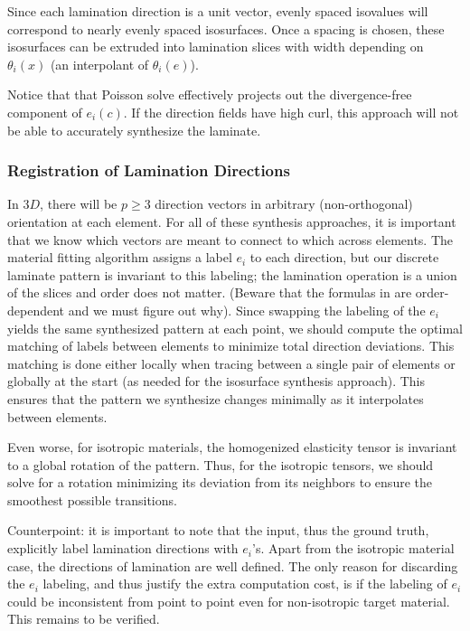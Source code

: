 \documentclass[10pt]{article}
\begin{document}
Since each lamination direction is a unit vector, evenly
spaced isovalues will correspond to nearly evenly spaced isosurfaces.
Once a spacing is chosen, these isosurfaces can be extruded into lamination
slices with width depending on $\theta_i(x)$ (an interpolant of $\theta_i(e)$).

Notice that that Poisson solve effectively projects out the divergence-free
component of $e_i(c)$. If the direction fields have high curl, this approach
will not be able to accurately synthesize the laminate.

\subsubsection{Registration of Lamination Directions}
\label{sec:registration}
In $3D$, there will be $p \ge 3$ direction vectors in arbitrary
(non-orthogonal) orientation at each element. For all of these synthesis
approaches, it is important that we know which vectors are meant to connect to
which across elements. The material fitting algorithm assigns a label $e_i$ to
each direction, but our discrete laminate pattern is invariant to this labeling;
the lamination operation is a union of the slices and order does not matter.
(Beware that the formulas in \cite{allaire2002shape} are order-dependent and we
must figure out why). Since swapping the labeling of the $e_i$ yields the same
synthesized pattern at each point, we should compute the optimal matching of
labels between elements to minimize total direction deviations. This matching is
done either locally when tracing between a single pair of elements or globally
at the start (as needed for the isosurface synthesis approach). This ensures
that the pattern we synthesize changes minimally as it interpolates between
elements.

Even worse, for isotropic materials, the homogenized elasticity tensor is
invariant to a global rotation of the pattern. Thus, for the isotropic tensors,
we should solve for a rotation minimizing its deviation from its neighbors to
ensure the smoothest possible transitions.

Counterpoint: it is important to note that the input, thus the ground truth,
explicitly label lamination directions with $e_i$'s.  Apart from the isotropic
material case, the directions of lamination are well defined.  The only reason
for discarding the $e_i$ labeling, and thus justify the extra computation cost,
is if the labeling of $e_i$ could be inconsistent from point to point even for
non-isotropic target material.  This remains to be verified.
\end{document}
